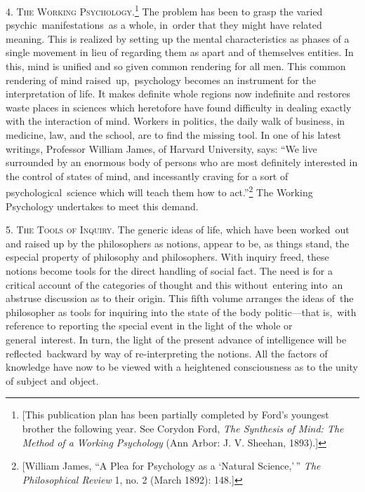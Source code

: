 \documentclass[twoside,symmetric,nobib,justified]{tufte-book}
\begin{document}
\vspace{0.05in}

4. \textsc{The Working Psychology}.\footnote{{[}This publication plan has been
  partially completed by Ford's youngest brother the following year. See
  Corydon Ford, \emph{The Synthesis of Mind: The Method of a Working
  Psychology} (Ann Arbor: J. V. Sheehan, 1893).{]}} The problem has been
to grasp the varied psychic~manifestations~as a whole, in~order that
they might have related meaning. This is realized by setting up the
mental characteristics as phases of a single movement in lieu of
regarding them as apart and of themselves entities. In this, mind is
unified and so given common rendering for all men. This common rendering
of mind raised~up,~psychology becomes an instrument for the
interpretation of life. It makes definite whole regions now indefinite
and restores waste places in sciences which heretofore have found
difficulty in dealing exactly with the interaction of mind. Workers in
politics, the daily walk of business, in medicine, law, and the school,
are to find the missing tool. In one of his latest writings, Professor
William James, of Harvard University, says: ``We live surrounded by an
enormous body of persons who are most definitely interested in the
control of states of mind, and incessantly craving for a sort of
psychological~science which will teach them how to act.''\footnote{{[}William
  James, ``A Plea for Psychology as a `Natural Science,'\,'' \emph{The
  Philosophical Review} 1, no. 2 (March 1892): 148.{]}} The Working
Psychology undertakes to meet this demand.

5. \textsc{The Tools of Inquiry}. The generic ideas of life, which have been
worked~out and raised up by the philosophers as notions, appear to be,
as things stand, the especial property of philosophy and philosophers.
With inquiry freed, these notions become tools for the direct handling
of social fact. The need is for a critical account of the categories of
thought and this without~entering into~an abstruse discussion as to
their origin. This fifth volume arranges the ideas of~the philosopher as
tools for inquiring into the state of the body politic---that is,~with
reference to reporting the special event in the light of the whole or
general~interest. In turn, the light of the present advance of
intelligence will be reflected~backward by way of re-interpreting the
notions. All the factors of knowledge have now to be viewed with a
heightened consciousness as to the unity of subject and object.~
\end{document}
